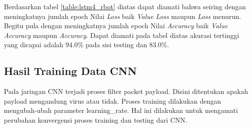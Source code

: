\documentclass[./skripsi.tex]{subfiles}
\begin{document}
\par Berdasarkan tabel \ref{table:lstm4_rbot} diatas dapat diamati bahwa seiring dengan meningkatnya jumlah epoch Nilai \textit{Loss} baik \textit{Value Loss} maupun \textit{Loss} menurun. Begitu pula dengan meningkatnya jumlah epoch Nilai \textit{Accuracy} baik \textit{Value Accuracy} maupun \textit{Accuracy}. Dapat diamati pada tabel diatas akurasi tertinggi yang dicapai adalah 94.0\% pada sisi testing dan 83.0\%.

\subsection{Hasil Training Data CNN}
\par Pada jaringan CNN terjadi proses filter packet payload. Disini ditentukan apakah payload mengandung virus atau tidak. Proses training dilakukan dengan mengubah-ubah parameter learning\_rate. Hal ini dilakukan untuk mengamati perubahan konvergensi proses training dan testing dari CNN.

\end{document}
